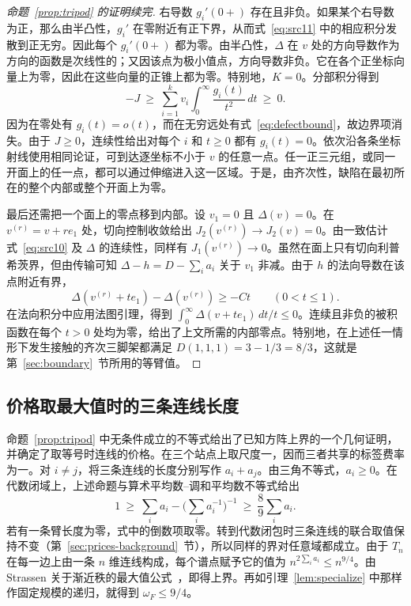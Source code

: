 \begin{proof}[命题~\ref{prop:tripod} 的证明续完]
右导数 $g_i'(0+)$ 存在且非负。如果某个右导数为正，那么由半凸性，$g_i'$ 在零附近有正下界，从而式~\eqref{eq:src11} 中的相应积分发散到正无穷。因此每个 $g_i'(0+)$ 都为零。由半凸性，$\Delta$ 在 $v$ 处的方向导数作为方向的函数是次线性的；又因该点为极小值点，方向导数非负。它在各个正坐标向量上为零，因此在这些向量的正锥上都为零。特别地，$K=0$。分部积分得到
\[
       -J\ \ge\ \sum_{i=1}^k v_i
                    \int_0^\infty\frac{g_i(t)}{t^2}\,dt\ \ge\ 0.
\]
因为在零处有 $g_i(t)=o(t)$，而在无穷远处有式~\eqref{eq:defectbound}，故边界项消失。由于 $J\ge0$，连续性给出对每个 $i$ 和 $t\ge0$ 都有 $g_i(t)=0$。依次沿各条坐标射线使用相同论证，可到达逐坐标不小于 $v$ 的任意一点。任一正三元组，或同一开面上的任一点，都可以通过伸缩进入这一区域。于是，由齐次性，缺陷在最初所在的整个内部或整个开面上为零。

最后还需把一个面上的零点移到内部。设 $v_1=0$ 且 $\Delta(v)=0$。在 $v^{(r)}=v+re_1$ 处，切向控制收敛给出 $J_2(v^{(r)})\to J_2(v)=0$。由一致估计式~\eqref{eq:src10} 及 $\Delta$ 的连续性，同样有 $J_1(v^{(r)})\to0$。虽然在面上只有切向利普希茨界，但由传输可知 $\Delta-h=D-\sum_i a_i$ 关于 $v_1$ 非减。由于 $h$ 的法向导数在该点附近有界，
\[
 \Delta(v^{(r)}+te_1)-\Delta(v^{(r)})\ge-Ct \qquad(0<t\le1).
\]
在法向积分中应用法图引理，得到 $\int_0^\infty\Delta(v+te_1)\,dt/t\le0$。连续且非负的被积函数在每个 $t>0$ 处均为零，给出了上文所需的内部零点。特别地，在上述任一情形下发生接触的齐次三脚架都满足 $D(1,1,1)=3-1/3=8/3$，这就是第~\ref{sec:boundary}~节所用的等臂值。
\end{proof}

\subsection{价格取最大值时的三条连线长度}

命题~\ref{prop:tripod} 中无条件成立的不等式给出了已知方阵上界的一个几何证明，并确定了取等号时连线的价格。在三个站点上取尺度一，因而三者共享的标签费率为一。对 \(i\ne j\)，将三条连线的长度分别写作 \(a_i+a_j\)。由三角不等式，\(a_i\ge0\)。在代数闭域上，上述命题与算术平均数–调和平均数不等式给出
\begin{equation}\label{eq:arm-perimeter}
  1\ \ge\ \sum_i a_i-\Big(\sum_i a_i^{-1}\Big)^{-1}
     \ \ge\ \frac89\sum_i a_i .
\end{equation}
若有一条臂长度为零，式中的倒数项取零。转到代数闭包时三条连线的联合取值保持不变（第~\ref{sec:prices-background}~节），所以同样的界对任意域都成立。由于 \(T_n\) 在每一边上由一条 \(n\) 维连线构成，每个谱点赋予它的值为 \(n^{2\sum_i a_i}\le n^{9/4}\)。由Strassen 关于渐近秩的最大值公式~\cite{spectrum}，即得上界。再如引理~\ref{lem:specialize} 中那样作固定规模的递归，就得到 \(\omega_F\le9/4\)。

